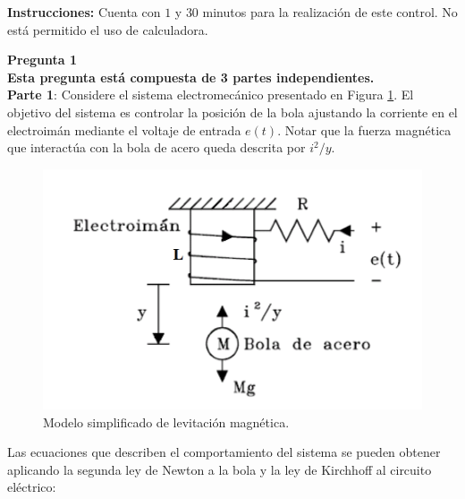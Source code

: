  
\textbf{Instrucciones:} Cuenta con $1$ y $30$ minutos para la realización de este control. No está permitido el uso de calculadora.
 
\vspace{0.5cm}
\setlength\parindent{0pt} \textbf{\large Pregunta 1} \\
\textbf{Esta pregunta está compuesta de 3 partes independientes.}\\
\textbf{Parte 1}:
Considere el sistema electromecánico presentado en Figura \ref{fig:1}. El objetivo del sistema es controlar la
posición de la bola ajustando la corriente en el electroimán mediante el voltaje
de entrada $e(t)$. Notar que la fuerza magnética que interactúa con la bola de acero queda descrita por $i^2/y$. 
\begin{figure}
    \centering
    \includegraphics[width=0.6\linewidth]{img/C1_figura.png}
    \caption{Modelo simplificado de levitación magnética.}
    \label{fig:1}
\end{figure}

Las ecuaciones que describen el comportamiento del sistema se pueden obtener aplicando la segunda ley de Newton a la bola y la ley de Kirchhoff al circuito eléctrico:

